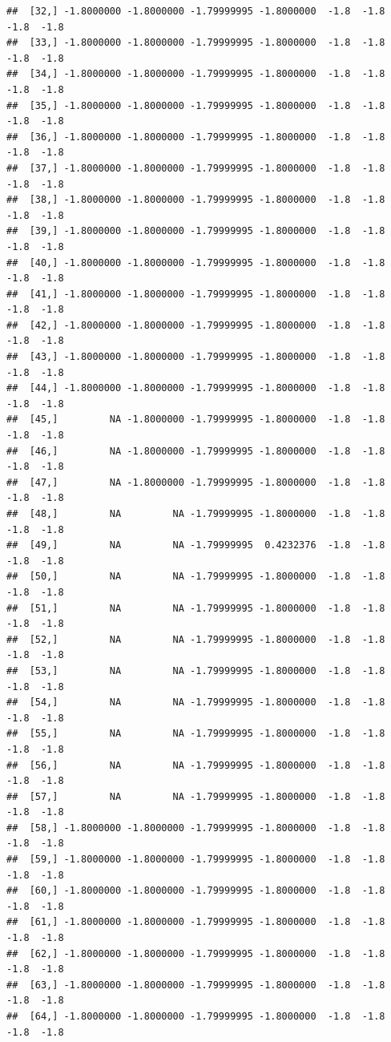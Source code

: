 \documentclass{article}\usepackage[]{graphicx}\usepackage[]{color}
\makeatletter
\newenvironment{kframe}{%
 \def\at@end@of@kframe{}%
 \ifinner\ifhmode%
  \def\at@end@of@kframe{\end{minipage}}%
  \begin{minipage}{\columnwidth}%
 \fi\fi%
 \def\FrameCommand##1{\hskip\@totalleftmargin \hskip-\fboxsep
 \colorbox{shadecolor}{##1}\hskip-\fboxsep
     \hskip-\linewidth \hskip-\@totalleftmargin \hskip\columnwidth}%
 \MakeFramed {\advance\hsize-\width
   \@totalleftmargin\z@ \linewidth\hsize
   \@setminipage}}%
 {\par\unskip\endMakeFramed%
 \at@end@of@kframe}
\newenvironment{knitrout}{}{} %
\makeatother
\begin{document}
\begin{knitrout}
\begin{kframe}
\begin{verbatim}
##  [32,] -1.8000000 -1.8000000 -1.79999995 -1.8000000  -1.8  -1.8  -1.8  -1.8
##  [33,] -1.8000000 -1.8000000 -1.79999995 -1.8000000  -1.8  -1.8  -1.8  -1.8
##  [34,] -1.8000000 -1.8000000 -1.79999995 -1.8000000  -1.8  -1.8  -1.8  -1.8
##  [35,] -1.8000000 -1.8000000 -1.79999995 -1.8000000  -1.8  -1.8  -1.8  -1.8
##  [36,] -1.8000000 -1.8000000 -1.79999995 -1.8000000  -1.8  -1.8  -1.8  -1.8
##  [37,] -1.8000000 -1.8000000 -1.79999995 -1.8000000  -1.8  -1.8  -1.8  -1.8
##  [38,] -1.8000000 -1.8000000 -1.79999995 -1.8000000  -1.8  -1.8  -1.8  -1.8
##  [39,] -1.8000000 -1.8000000 -1.79999995 -1.8000000  -1.8  -1.8  -1.8  -1.8
##  [40,] -1.8000000 -1.8000000 -1.79999995 -1.8000000  -1.8  -1.8  -1.8  -1.8
##  [41,] -1.8000000 -1.8000000 -1.79999995 -1.8000000  -1.8  -1.8  -1.8  -1.8
##  [42,] -1.8000000 -1.8000000 -1.79999995 -1.8000000  -1.8  -1.8  -1.8  -1.8
##  [43,] -1.8000000 -1.8000000 -1.79999995 -1.8000000  -1.8  -1.8  -1.8  -1.8
##  [44,] -1.8000000 -1.8000000 -1.79999995 -1.8000000  -1.8  -1.8  -1.8  -1.8
##  [45,]         NA -1.8000000 -1.79999995 -1.8000000  -1.8  -1.8  -1.8  -1.8
##  [46,]         NA -1.8000000 -1.79999995 -1.8000000  -1.8  -1.8  -1.8  -1.8
##  [47,]         NA -1.8000000 -1.79999995 -1.8000000  -1.8  -1.8  -1.8  -1.8
##  [48,]         NA         NA -1.79999995 -1.8000000  -1.8  -1.8  -1.8  -1.8
##  [49,]         NA         NA -1.79999995  0.4232376  -1.8  -1.8  -1.8  -1.8
##  [50,]         NA         NA -1.79999995 -1.8000000  -1.8  -1.8  -1.8  -1.8
##  [51,]         NA         NA -1.79999995 -1.8000000  -1.8  -1.8  -1.8  -1.8
##  [52,]         NA         NA -1.79999995 -1.8000000  -1.8  -1.8  -1.8  -1.8
##  [53,]         NA         NA -1.79999995 -1.8000000  -1.8  -1.8  -1.8  -1.8
##  [54,]         NA         NA -1.79999995 -1.8000000  -1.8  -1.8  -1.8  -1.8
##  [55,]         NA         NA -1.79999995 -1.8000000  -1.8  -1.8  -1.8  -1.8
##  [56,]         NA         NA -1.79999995 -1.8000000  -1.8  -1.8  -1.8  -1.8
##  [57,]         NA         NA -1.79999995 -1.8000000  -1.8  -1.8  -1.8  -1.8
##  [58,] -1.8000000 -1.8000000 -1.79999995 -1.8000000  -1.8  -1.8  -1.8  -1.8
##  [59,] -1.8000000 -1.8000000 -1.79999995 -1.8000000  -1.8  -1.8  -1.8  -1.8
##  [60,] -1.8000000 -1.8000000 -1.79999995 -1.8000000  -1.8  -1.8  -1.8  -1.8
##  [61,] -1.8000000 -1.8000000 -1.79999995 -1.8000000  -1.8  -1.8  -1.8  -1.8
##  [62,] -1.8000000 -1.8000000 -1.79999995 -1.8000000  -1.8  -1.8  -1.8  -1.8
##  [63,] -1.8000000 -1.8000000 -1.79999995 -1.8000000  -1.8  -1.8  -1.8  -1.8
##  [64,] -1.8000000 -1.8000000 -1.79999995 -1.8000000  -1.8  -1.8  -1.8  -1.8

\end{verbatim}
\end{kframe}
\end{knitrout}
\end{document}
